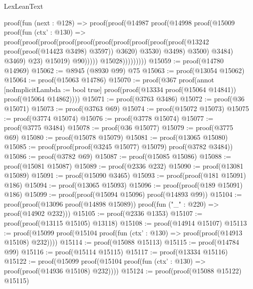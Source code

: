 \begin{lexlean}{LexLeanText}
\begin{coremodule}
                      proof(fun (next : @128) =>
                        proof(proof(@14987
                              proof(@14998
                                  proof(@15009
                                      proof(fun (ctx' : @130) =>
                                        proof(proof(proof(proof(proof(proof(proof(proof(proof(proof(@13242
                                                              proof(proof(@14423 @3498) @3597))
                                                            @3620)
                                                          @3530)
                                                        @3498)
                                                      @3500)
                                                    @3484)
                                                  @3469)
                                                @23)
                                              @15019)
                                            @90)))))
                            @15028)))))))))
@15059 := proof(@14780 @14969)
@15062 := @8945 (@8930 @99) @75
@15063 := proof(@13054 @15062)
@15064 := proof(@15063 @14786)
@15070 := proof(@367
      proof(annot [noImplicitLambda := bool true]
        proof(proof(@13334 proof(@15064 @14841)) proof(@15064 @14862))))
@15071 := proof(@3763 @3486)
@15072 := proof(@36 @15071)
@15073 := proof(@3763 @69)
@15074 := proof(@15072 @15073)
@15075 := proof(@3774 @15074)
@15076 := proof(@3778 @15074)
@15077 := proof(@3775 @3484)
@15078 := proof(@36 @15077)
@15079 := proof(@3775 @69)
@15080 := proof(@15078 @15079)
@15081 := proof(@13065 @15080)
@15085 := proof(proof(proof(@3245 @15077) @15079) proof(@3782 @3484))
@15086 := proof(@3782 @69)
@15087 := proof(@15085 @15086)
@15088 := proof(@15081 @15087)
@15089 := proof(@2336 @232)
@15090 := proof(@13081 @15089)
@15091 := proof(@15090 @3465)
@15093 := proof(proof(@181 @15091) @186)
@15094 := proof(@13065 @15093)
@15096 := proof(proof(@189 @15091) @186)
@15099 := proof(proof(@15094 @15096) proof(@14893 @99))
@15104 := proof(proof(@13096 proof(@14898 @15089)) proof(fun ("_" : @220) => proof(@14902 @232)))
@15105 := proof(@2336 @1353)
@15107 := proof(proof(@13115 @15105) @13118)
@15108 := proof(@14914 @15107)
@15113 := proof(@15099 proof(@15104 proof(fun (ctx' : @130) => proof(proof(@14913 @15108) @232))))
@15114 := proof(@15088 @15113)
@15115 := proof(@14784 @99)
@15116 := proof(@15114 @15115)
@15117 := proof(@13334 @15116)
@15122 := proof(@15099 proof(@15104 proof(fun (ctx' : @130) => proof(proof(@14936 @15108) @232))))
@15124 := proof(proof(@15088 @15122) @15115)

\end{coremodule}
\end{lexlean}
